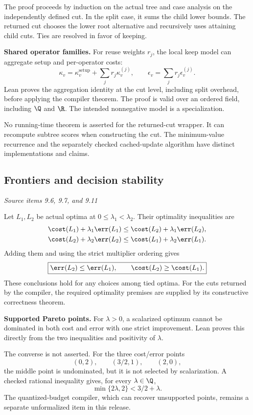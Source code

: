 The proof proceeds by induction on the actual tree and case analysis on the independently defined cut. In the split case, it sums the child lower bounds. The returned cut chooses the lower root alternative and recursively uses attaining child cuts. Ties are resolved in favor of keeping.

\textbf{Shared operator families.} For reuse weights $r_j$, the local keep model can aggregate setup and per-operator costs:
\[
\kappa_v=\kappa_v^{\mathrm{setup}}+\sum_jr_j\kappa_v^{(j)},
\qquad \epsilon_v=\sum_jr_j\epsilon_v^{(j)}.
\]
Lean proves the aggregation identity at the cut level, including split overhead, before applying the compiler theorem. The proof is valid over an ordered field, including $\Q$ and $\R$. The intended nonnegative model is a specialization.

No running-time theorem is asserted for the returned-cut wrapper. It can recompute subtree scores when constructing the cut. The minimum-value recurrence and the separately checked cached-update algorithm have distinct implementations and claims.



\subsection{Frontiers and decision stability}\label{supp2:subsection:002}\textit{Source items 9.6, 9.7, and 9.11}\par
Let $L_1,L_2$ be actual optima at $0\leq\lambda_1<\lambda_2$. Their optimality inequalities are
\begin{align*}
\cost(L_1)+\lambda_1\err(L_1)&\leq\cost(L_2)+\lambda_1\err(L_2),\\
\cost(L_2)+\lambda_2\err(L_2)&\leq\cost(L_1)+\lambda_2\err(L_1).
\end{align*}
Adding them and using the strict multiplier ordering gives
\[
\boxed{\err(L_2)\leq\err(L_1),\qquad \cost(L_2)\geq\cost(L_1).}
\]
These conclusions hold for any choices among tied optima. For the cuts returned by the compiler, the required optimality premises are supplied by its constructive correctness theorem.

\textbf{Supported Pareto points.} For $\lambda>0$, a scalarized optimum cannot be dominated in both cost and error with one strict improvement. Lean proves this directly from the two inequalities and positivity of $\lambda$.

The converse is not asserted. For the three cost/error points
\[
(0,2),\qquad (3/2,1),\qquad (2,0),
\]
the middle point is undominated, but it is not selected by scalarization. A checked rational inequality gives, for every $\lambda\in\Q$,
\[
\min\{2\lambda,2\}<3/2+\lambda.
\]
The quantized-budget compiler, which can recover unsupported points, remains a separate unformalized item in this release.


